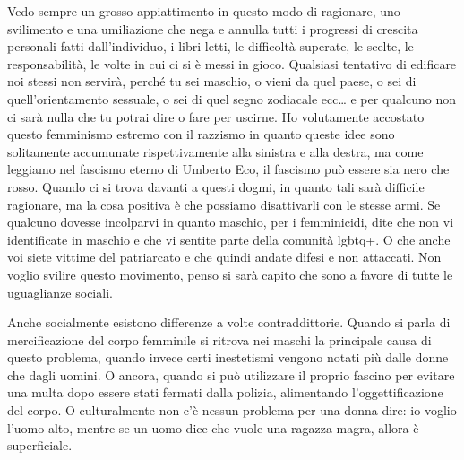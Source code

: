 \documentclass[12pt]{book} %
\begin{document}
Vedo sempre un grosso appiattimento in questo modo di ragionare, uno svilimento e una umiliazione che nega e annulla tutti i progressi di crescita personali fatti dall'individuo, i libri letti, le difficoltà superate, le scelte, le responsabilità, le volte in cui ci si è messi in gioco. Qualsiasi tentativo di edificare noi stessi non servirà, perché tu sei maschio, o vieni da quel paese, o sei di quell'orientamento sessuale, o sei di quel segno zodiacale ecc… e per qualcuno non ci sarà nulla che tu potrai dire o fare per uscirne. Ho volutamente accostato questo femminismo estremo con il razzismo in quanto queste idee sono solitamente accumunate rispettivamente alla sinistra e alla destra, ma come leggiamo nel fascismo eterno di Umberto Eco, il fascismo può essere sia nero che rosso. 
Quando ci si trova davanti a questi dogmi, in quanto tali sarà difficile ragionare, ma la cosa positiva è che possiamo disattivarli con le stesse armi. Se qualcuno dovesse incolparvi in quanto maschio, per i femminicidi, dite che non vi identificate in maschio e che vi sentite parte della comunità lgbtq+. O che anche voi siete vittime del patriarcato e che quindi andate difesi e non attaccati. Non voglio svilire questo movimento, penso si sarà capito che sono a favore di tutte le uguaglianze sociali.

Anche socialmente esistono differenze a volte contraddittorie. Quando si parla di mercificazione del corpo femminile si
ritrova nei maschi la principale causa di questo problema, quando invece certi inestetismi vengono notati più dalle
donne che dagli uomini. 
O ancora, quando si può utilizzare il proprio fascino per evitare una multa dopo essere stati fermati dalla polizia,
alimentando l'oggettificazione del corpo. O culturalmente non c'è nessun problema per una donna dire: io voglio l'uomo alto, mentre se un uomo dice che vuole una ragazza magra, allora è superficiale.
\end{document}
